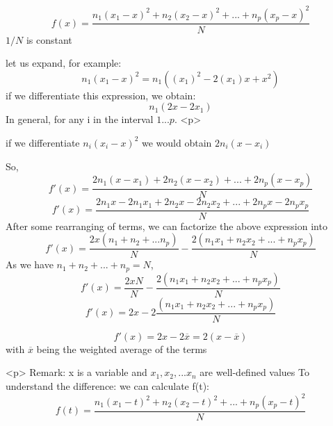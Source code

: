 $$
f(x)=\frac{n_1(x_1-x)^2 +n_2(x_2-x)^2 + ... + n_p (x_p - x)^2}{N}
$$
$1/N$ is constant

let us expand, for example:
$$
n_1(x_1 - x)^2
=n_1((x_1)^2 - 2(x_1)x + x^2)
$$
if we differentiate this expression, we obtain:
$$
n_1(2x - 2x_1)
$$
In general, for any i in the interval $1...p$.
<p>

if we differentiate $n_i(x_i - x)^2$ we would obtain  $2n_i(x - x_i)$

So, 
$$
f'(x) = \frac{2n_1(x-x_1) + 2n_2(x-x_2) + ... + 2n_p(x-x_p)}{N}
$$
$$
f'(x) = \frac{2n_1x-2n_1x_1 + 2n_2x-2n_2x_2 + ... + 2n_px-2n_px_p}{N}
$$
After some rearranging of terms, we can factorize the above expression into
$$
f'(x) = \frac{2x(n_1+n_2+...n_p)}{N} -\frac{2(n_1 x_1+n_2 x_2+...+n_p x_p)}{N}
$$
As we have $n_1 + n_2 + ... + n_p = N$,
$$
f'(x) = \frac{2xN}{N} -\frac{2(n_1 x_1+n_2 x_2+...+n_p x_p)}{N}
$$
$$
f'(x) = 2x - 2\frac{(n_1 x_1+n_2 x_2+...+n_p x_p)}{N}
$$

$$
f'(x) = 2x - 2\overline{x} = 2(x - \overline{x})
$$
with $\overline{x}$ being the weighted average of the terms

<p>
Remark:
x is a variable and $x_1, x_2, ... x_n$ are well-defined values
To understand the difference:
we can calculate f(t):
$$
f(t)=\frac{n_1(x_1-t)^2 +n_2(x_2-t)^2 + ... + n_p (x_p - t)^2}{N}
$$
